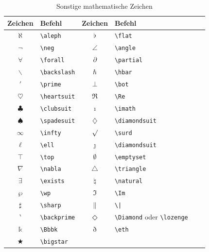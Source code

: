 \documentclass[a4paper,10pt,twoside]{scrbook}
\begin{document}
{\begin{table}[h!tb]
\centering
\caption{Sonstige mathematische Zeichen}
\label{Tabelle_Sonstige_Zeichen1}       %
\begin{tabular}{clclcl}
\hline
Zeichen & Befehl & Zeichen & Befehl  \\
\hline
$\aleph$ & \texttt{\textbackslash aleph} & 
$\flat$ & \texttt{\textbackslash flat} \\
$\neg$ & \texttt{\textbackslash neg} &
$\angle$ & \texttt{\textbackslash angle} \\
$\forall$ & \texttt{\textbackslash forall} &
$\partial$ & \texttt{\textbackslash partial}\\
$\backslash$ & \texttt{\textbackslash backslash} & 
$\hbar$ & \texttt{\textbackslash hbar} \\
$\prime$ & \texttt{\textbackslash prime} &
$\bot$ & \texttt{\textbackslash bot} \\
$\heartsuit$ & \texttt{\textbackslash heartsuit} & 
$\Re$ & \texttt{\textbackslash Re}\\
$\clubsuit$ & \texttt{\textbackslash clubsuit} & 
$\imath$ & \texttt{\textbackslash imath} \\
$\spadesuit$ & \texttt{\textbackslash spadesuit} &
$\diamondsuit$ & \texttt{\textbackslash diamondsuit} \\
$\infty$ & \texttt{\textbackslash infty} &
$\surd$ & \texttt{\textbackslash surd}\\
$\ell$ & \texttt{\textbackslash ell} & 
$\jmath$ & \texttt{\textbackslash diamondsuit} \\
$\top$ & \texttt{\textbackslash top} &
$\emptyset$ & \texttt{\textbackslash emptyset} \\
$\nabla$ & \texttt{\textbackslash nabla} &
$\triangle$ & \texttt{\textbackslash triangle}\\
$\exists$ & \texttt{\textbackslash exists} & 
$\natural$ & \texttt{\textbackslash natural} \\
$\wp$ & \texttt{\textbackslash wp} &
$\Im$ & \texttt{\textbackslash Im} \\ 
$\sharp$ & \texttt{\textbackslash sharp}&
$\|$ & \texttt{\textbackslash |}\\
$\backprime$ & \texttt{\textbackslash backprime} & 
$\Diamond$ & \texttt{\textbackslash Diamond} oder \texttt{\textbackslash lozenge} \\
$\Bbbk$ & \texttt{\textbackslash Bbbk} &
$\eth$ & \texttt{\textbackslash eth} \\
$\bigstar$ & \texttt{\textbackslash bigstar} &

\end{tabular}
\end{table}}
\end{document}
